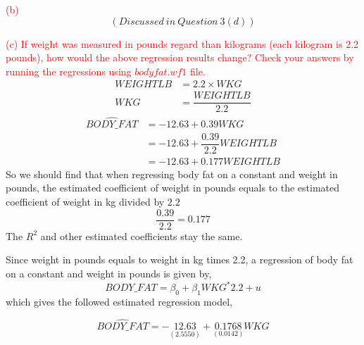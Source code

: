 \documentclass[12pt]{report}
\begin{document}
\noindent \textcolor{red}{(b)} $$(Discussed\ in\ Question\ 3(d))$$

\noindent \textcolor{red}{(c) If weight was measured in pounds regard than kilograms (each kilogram is 2.2 pounds), how would the above regression results change? Check your answers by running the regressions using $bodyfat.wf1$ file.} \begin{align*}
	WEIGHTLB &= 2.2\times WKG \\
	WKG &= \dfrac{WEIGHTLB}{2.2}  
\end{align*} 
\begin{align*}
	\widehat{BODY\_FAT} &= -12.63 + 0.39WKG \\
	&= -12.63 + \dfrac{0.39}{2.2}WEIGHTLB \\
	&= -12.63 + 0.177WEIGHTLB
\end{align*} So we should find that when regressing body fat on a constant and weight in pounds, the estimated coefficient of weight in pounds equals to the estimated coefficient of weight in kg divided by $2.2$ $$\dfrac{0.39}{2.2} = 0.177$$ The $R^2$ and other estimated coefficients stay the same.

\noindent Since weight in pounds equals to weight in kg times 2.2, a regression of body fat on a constant and weight in pounds is given by, $$BODY\_FAT = \beta_0 + \beta_1 WKG^*2.2 + u$$ which gives the followed estimated regression model,
\begin{figure}[H]
\end{figure}
\vspace{-\baselineskip} $$\widehat{BODY\_FAT} = -\underset{(2.5550)}{12.63} + \underset{(0.0142)}{0.1768} WKG$$
\end{document}
